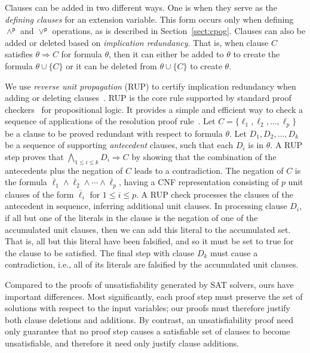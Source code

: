 \documentclass[letterpaper,USenglish,cleveref, autoref, thm-restate]{lipics-v2021}
\newcommand{\pand}{\mathbin{\land^\textsf{p}}}
\newcommand{\por}{\mathbin{\lor^\textsf{p}}}
\newcommand{\obar}[1]{\overline{#1}}
\newcommand{\lit}{\ell}
\newcommand{\imply}{\Rightarrow}
\begin{document}
Clauses can be added in two different ways.  One is when they serve as
the \emph{defining clauses} for an extension variable.  This form
occurs only when defining $\pand$ and $\por$ operations, as is
described in Section~\ref{sect:cpog}.  Clauses can also be added or
deleted based on \emph{implication redundancy}.  That is, when clause
$C$ satisfies $\theta \imply C$ for formula $\theta$, then it can either
be added to $\theta$ to create the formula $\theta \cup \{C\}$ or it can be deleted
from $\theta \cup \{C\}$ to create $\theta$.

We use \emph{reverse unit propagation} (RUP) to certify
implication redundancy when adding or deleting
clauses~\cite{goldberg,vangelder08_verifying_rup_proofs}.
RUP
is the core rule supported by standard
proof checkers~\cite{RAT,wetzler14_drattrim} for propositional logic. It provides a simple and efficient
way to check a sequence of applications of the resolution proof rule~\cite{robinson-1965}.
Let $C = \{\lit_1, \lit_2, \ldots,\lit_p\}$ be a clause to be
proved redundant with respect to formula $\theta$.  Let $D_1, D_2, \ldots, D_k$ be a sequence of supporting
\emph{antecedent} clauses, such that each $D_i$ is in $\theta$.
A RUP step
proves that $\bigwedge_{1\leq i \leq k} D_i \imply C$ by showing
that the combination of the antecedents plus the negation of $C$ leads
to a contradiction.  The negation of $C$ is the formula
$\overline{\lit}_1 \land \overline{\lit}_2 \land \cdots \land
\overline{\lit}_p$, having a CNF representation consisting of $p$ unit
clauses of the form $\obar{\lit}_i$ for $1 \leq i \leq p$.  A RUP
check processes the clauses of the antecedent in sequence, inferring
additional unit clauses.  In processing clause $D_i$, if all but one
of the literals in the clause is the negation of one of the
accumulated unit clauses, then we can add this literal to the
accumulated set.  That is, all but this literal have been falsified,
and so it must be set to true for the clause to be satisfied.  The
final step with clause $D_k$ must cause a contradiction, i.e., all of
its literals are falsified by the accumulated unit clauses.

Compared to the proofs of unsatisfiability generated by SAT solvers,
ours have important differences.  Most
significantly, each proof step must preserve the set of solutions with respect to the input variables;
our proofs must therefore justify both clause deletions and additions.
By contrast, an unsatisfiability proof need only guarantee that
no proof step causes a satisfiable set of clauses to become
unsatisfiable, and therefore it need only justify clause additions.
\end{document}
